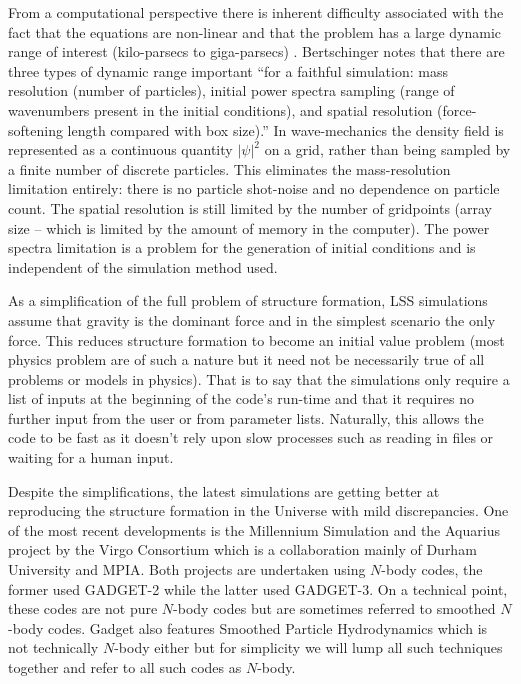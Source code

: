 From a computational perspective there is inherent difficulty associated with the fact that the equations are non-linear and that the problem has a large dynamic range of interest (kilo-parsecs to giga-parsecs) \citep{bib_hmpc}. Bertschinger \citep{bib_bert} notes that there are three types of dynamic range important ``for a faithful simulation: mass resolution (number of particles), initial power spectra sampling (range of wavenumbers present in the initial conditions), and spatial resolution (force-softening length compared with box size).'' In wave-mechanics the density field is represented as a continuous quantity $|\psi|^2$ on a grid, rather than being sampled by a finite number of discrete particles. This eliminates the mass-resolution limitation entirely: there is no particle shot-noise and no dependence on particle count. The spatial resolution is still limited by the number of gridpoints (array size -- which is limited by the amount of memory in the computer). The power spectra limitation is a problem for the generation of initial conditions and is independent of the simulation method used.

As a simplification of the full problem of structure formation, LSS simulations assume that gravity is the dominant force and in the simplest scenario the only force. This reduces structure formation to become an initial value problem (most physics problem are of such a nature but it need not be necessarily true of all problems or models in physics). That is to say that the simulations only require a list of inputs at the beginning of the code's run-time and that it requires no further input from the user or from parameter lists. Naturally, this allows the code to be fast as it doesn't rely upon slow processes such as reading in files or waiting for a human input.

Despite the simplifications, the latest simulations are getting better at reproducing the structure formation in the Universe with mild discrepancies. One of the most recent developments is the Millennium Simulation \citep{bib_spr, bib_mil} and the Aquarius project \citep{bib_aqu} by the Virgo Consortium which is a collaboration mainly of Durham University and MPIA. Both projects are undertaken using $N$-body codes, the former used GADGET-2 while the latter used GADGET-3. On a technical point, these codes are not pure $N$-body codes but are sometimes referred to smoothed $N$-body codes. Gadget also features Smoothed Particle Hydrodynamics which is not technically $N$-body either but for simplicity we will lump all such techniques together and refer to all such codes as $N$-body.

